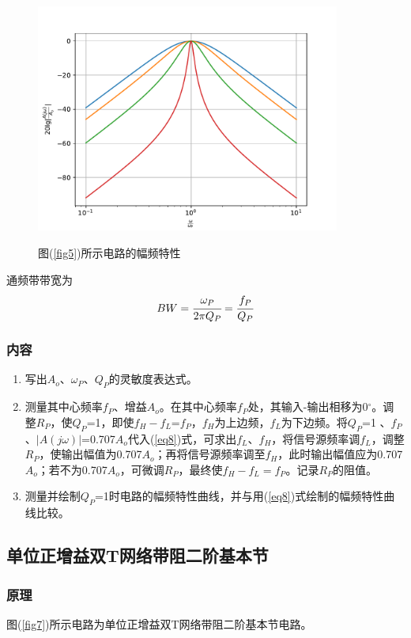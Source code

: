 \documentclass[a4paper]{article}
\begin{document}
\begin{figure}[!h]
\centering
\includegraphics[width=10cm]{fig/fig6.pdf}\\
\caption{图(\ref{fig5})所示电路的幅频特性}\label{fig6}
\end{figure}

通频带带宽为
\begin{equation}
BW = \cfrac{\omega_P}{2\pi Q_P} = \cfrac{f_P}{Q_P}\label{eq9}
\end{equation}
\subsubsection{内容}
\begin{enumerate}
\item 写出$A_o$、$\omega_P$、$Q_P$的灵敏度表达式。
\item 测量其中心频率$f_P$、增益$A_o$。在其中心频率$f_P$处，其输入-输出相移为0$^{\circ}$。调整$R_P$，使$Q_P$=1，即使$f_H - f_L$=$f_P$，$f_H$为上边频，$f_L$为下边频。将$Q_P$=1 、$f_P$、$|A(j\omega)|$=0.707$A_o$代入(\ref{eq8})式，可求出$f_L$、$f_H$，将信号源频率调$f_L$，调整$R_P$，使输出幅值为0.707$A_o$；再将信号源频率调至$f_H$，此时输出幅值应为0.707$A_o$；若不为0.707$A_o$，可微调$R_P$，最终使$f_H - f_L=f_P$。记录$R_P$的阻值。
\item 测量并绘制$Q_P$=1时电路的幅频特性曲线，并与用(\ref{eq8})式绘制的幅频特性曲线比较。
\end{enumerate}

\subsection{单位正增益双T网络带阻二阶基本节}
\subsubsection{原理}
图(\ref{fig7})所示电路为单位正增益双T网络带阻二阶基本节电路。
\end{document}
